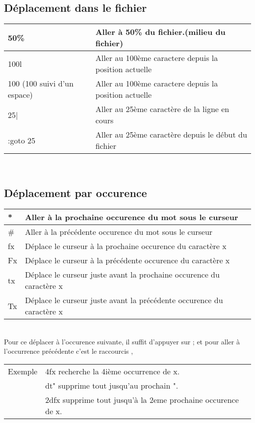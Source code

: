 \documentclass{article}
\begin{document}
\subsection{Déplacement dans le fichier}
\begin{tabular}{|p{3cm}| l| }
    \hline
    50\% & Aller à 50\% du fichier.(milieu du fichier) \\ \hline
    100l & Aller au 100ème caractere depuis la position actuelle \\ \hline
    100 (100 suivi d'un espace) & Aller au 100ème caractere depuis la position actuelle \\ \hline
    25| & Aller au 25ème caractère de la ligne en cours\\ \hline
    :goto 25 & Aller au 25ème caractère depuis le début du fichier\\ \hline
\end{tabular}\\

\subsection{Déplacement par occurence}
\begin{tabular}{|p{3cm}| l| }
    \hline
    * & Aller à la prochaine occurence du mot sous le curseur \\ \hline
    \# & Aller à la précédente occurence du mot sous le curseur \\ \hline
    fx & Déplace le curseur à la prochaine occurence du caractère x \\ \hline
    Fx & Déplace le curseur à la précédente occurence du caractère x \\ \hline
    tx & Déplace le curseur juste avant la prochaine occurence du caractère x \\ \hline
    Tx & Déplace le curseur juste avant la précédente occurence du caractère x \\ \hline
\end{tabular}\\

Pour ce déplacer à l'occurence suivante, il suffit d'appuyer sur ; et pour aller à l'occurrence précédente c'est le raccourcis ,

\begin{tabular}{l l}
    Exemple&	4fx recherche la 4ième occurrence de x.\\
    &dt" supprime tout jusqu'au prochain ".\\
    &2dfx supprime tout jusqu'à la 2eme prochaine occurence de x.\\
\end{tabular}\\
\end{document}
